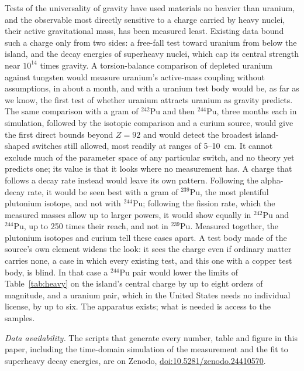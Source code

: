 \documentclass[aps,prd,onecolumn,superscriptaddress,floatfix,nofootinbib]{revtex4-2}
\newcommand{\Pu}[1]{$^{#1}$Pu}
\begin{document}
Tests of the universality of gravity have used materials no heavier than uranium, and the observable most directly
sensitive to a charge carried by heavy nuclei, their active gravitational mass, has been measured least. Existing
data bound such a charge only from two sides: a free-fall test toward uranium from below the island, and the decay
energies of superheavy nuclei, which cap its central strength near $10^{14}$ times gravity. A torsion-balance
comparison of depleted uranium against tungsten would measure uranium's active-mass coupling without assumptions,
in about a month, and with a uranium test body would be, as far as we know, the first test of whether uranium
attracts uranium as gravity predicts. The same comparison with a gram of \Pu{242} and then \Pu{244}, three months each in simulation,
followed by the isotopic comparison and a curium source, would give the first direct bounds beyond $Z=92$ and would
detect the broadest island-shaped switches still allowed, most readily at ranges of 5--10~cm. It cannot exclude
much of the parameter space of any particular switch, and no theory yet predicts one; its value is that it looks
where no measurement has. A charge that follows a decay rate instead would leave its own pattern. Following the
alpha-decay rate, it would be seen best with a gram of \Pu{239}, the most plentiful plutonium isotope, and not with
\Pu{244}; following the fission rate, which the measured masses allow up to larger powers, it would show equally in
\Pu{242} and \Pu{244}, up to 250 times their reach, and not in \Pu{239}. Measured together, the plutonium isotopes
and curium tell these cases apart. A test body made of the source's own element widens the look: it sees the charge even if
ordinary matter carries none, a case in which every existing test, and this one with a copper test body, is blind.
In that case a \Pu{244} pair would lower the limits of Table~\ref{tab:heavy} on the island's central charge by up to
eight orders of magnitude, and a uranium pair, which in the United States needs no individual license, by up to six.
The apparatus exists; what is needed is access to the samples.

\textit{Data availability.} The scripts that generate every number, table and figure in this paper, including the
time-domain simulation of the measurement and the fit to superheavy decay energies, are on Zenodo,
\href{https://doi.org/10.5281/zenodo.24410570}{doi:10.5281/zenodo.24410570}.

\FloatBarrier
\end{document}
